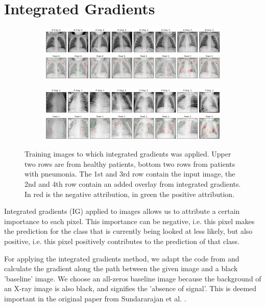 \section{Integrated Gradients}


\begin{figure}
    \centering
    \begin{subfigure}{\textwidth}
        \includegraphics[width=1\textwidth]{images/IG_train.png}
    \end{subfigure}
    \centering
    \begin{subfigure}{\textwidth}
        \includegraphics[width=1\textwidth]{images/IG_train_P.png}
    \end{subfigure}
    \caption{Training images to which integrated gradients was applied. Upper two rows are from healthy patients, bottom two rows from patients with pneumonia. The 1st and 3rd row contain the input image, the 2nd and 4th row contain an added overlay from integrated gradients. In red is the negative attribution, in green the positive attribution.}
    \label{fig:ig_train}
\end{figure}

Integrated gradients (IG) applied to images allows us to attribute a certain importance to each pixel. This importance can be negative, i.e. this pixel makes the prediction for the class that is currently being looked at less likely, but also positive, i.e. this pixel positively contributes to the prediction of that class.

For applying the integrated gradients method, we adapt the code from \cite{alibi} and calculate the gradient along the path between the given image and a black 'baseline' image. We choose an all-zeros baseline image because the background of an X-ray image is also black, and signifies the 'absence of signal'. This is deemed important in the original paper from Sundararajan et al. \cite{ig}.

